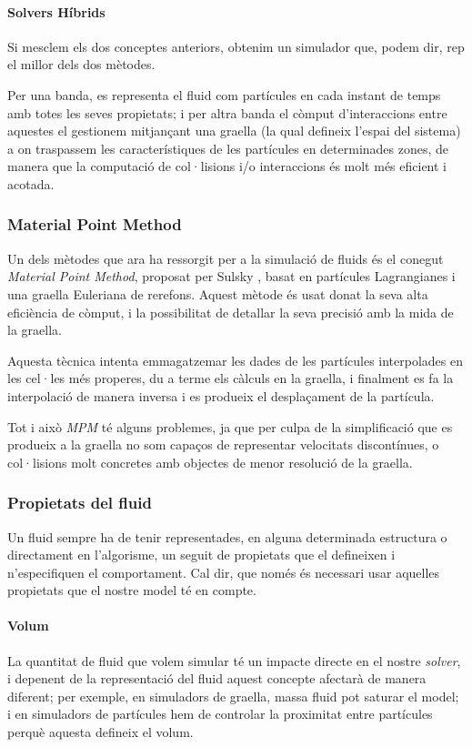 \documentclass[a4paper]{article} %
\begin{document}
	\paragraph[Híbrids]{\quad Solvers Híbrids} Si mesclem els dos conceptes anteriors, obtenim un simulador que, podem dir, rep el millor dels dos mètodes.\par
	Per una banda, es representa el fluid com partícules en cada instant de temps amb totes les seves propietats; i per altra banda el còmput d'interaccions entre aquestes el gestionem mitjançant una graella (la qual defineix l'espai del sistema) a on traspassem les característiques de les partícules en determinades zones, de manera que la computació de col·lisions i/o interaccions és molt més eficient i acotada.
	
	\subsubsection[MPM]{Material Point Method}
	Un dels mètodes que ara ha ressorgit per a la simulació de fluids és el conegut \textit{Material Point Method}, proposat per Sulsky \cite{Sulsky1995}, basat en partícules Lagrangianes i una graella Euleriana de rerefons. Aquest mètode és usat donat la seva alta eficiència de còmput, i la possibilitat de detallar la seva precisió amb la mida de la graella. \par
	Aquesta tècnica intenta emmagatzemar les dades de les partícules interpolades en les cel·les més properes, du a terme els càlculs en la graella, i finalment es fa la interpolació de manera inversa i es produeix el desplaçament de la partícula. \par
	Tot i això \textit{MPM} té alguns problemes, ja que per culpa de la simplificació que es produeix a la graella no som capaços de representar velocitats discontínues, o col·lisions molt concretes amb objectes de menor resolució de la graella. 
	
	
	\subsubsection{Propietats del fluid} 
	Un fluid sempre ha de tenir representades, en alguna determinada estructura o directament en l'algorisme, un seguit de propietats que el defineixen i n'especifiquen el comportament. Cal dir, que només és necessari usar aquelles propietats que el nostre model té en compte.
	\paragraph{\quad Volum} La quantitat de fluid que volem simular té un impacte directe en el nostre \textit{solver}, i depenent de la representació del fluid aquest concepte afectarà de manera diferent; per exemple, en simuladors de graella, massa fluid pot saturar el model; i en simuladors de partícules hem de controlar la proximitat entre partícules perquè aquesta defineix el volum.
\end{document}
